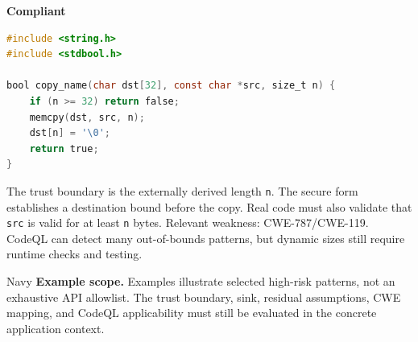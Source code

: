 \documentclass[10pt,letterpaper]{article}
\newcommand{\code}[1]{\texttt{\small #1}}
\begin{document}
\textbf{Compliant}\par
\begin{lstlisting}[language={C}]
#include <string.h>
#include <stdbool.h>

bool copy_name(char dst[32], const char *src, size_t n) {
    if (n >= 32) return false;
    memcpy(dst, src, n);
    dst[n] = '\0';
    return true;
}
\end{lstlisting}

The trust boundary is the externally derived length \code{n}. The secure form establishes a destination bound before the copy. Real code must also validate that \code{src} is valid for at least \code{n} bytes. Relevant weakness: CWE-787/CWE-119. CodeQL can detect many out-of-bounds patterns, but dynamic sizes still require runtime checks and testing.\par
\begin{callout}{Navy}
\textbf{Example scope.} Examples illustrate selected high-risk patterns, not an exhaustive API allowlist. The trust boundary, sink, residual assumptions, CWE mapping, and CodeQL applicability must still be evaluated in the concrete application context.
\end{callout}
\end{document}
